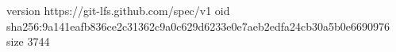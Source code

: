 version https://git-lfs.github.com/spec/v1
oid sha256:9a141eafb836ce2c31362c9a0c629d6233e0e7aeb2edfa24cb30a5b0e6690976
size 3744
